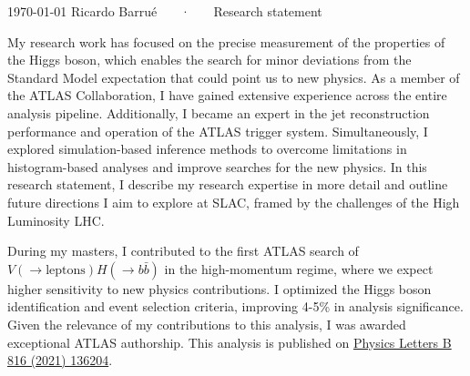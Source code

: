 \documentclass[11pt, a4paper]{awesome-cv}
\begin{document}
\makecvheader[R]

\makecvfooter
  {\today}
  {Ricardo Barrué ~~~·~~~ Research statement}
  {}

\makelettertitle

\begin{cvletter}

  My research work has focused on the precise measurement of the properties of the Higgs boson, which enables the search for minor deviations from the Standard Model expectation that could point us to new physics. As a member of the ATLAS Collaboration, I have gained extensive experience across the entire analysis pipeline. Additionally, I became an expert in the jet reconstruction performance and operation of the ATLAS trigger system. Simultaneously, I explored simulation-based inference methods to overcome limitations in histogram-based analyses and improve searches for the new physics. In this research statement, I describe my research expertise in more detail and outline future directions I aim to explore at SLAC, framed by the challenges of the High Luminosity LHC.

  
  During my masters, I contributed to the first ATLAS search of $V(\to \textrm{leptons})H(\to b\bar{b})$ in the high-momentum regime, where we expect higher sensitivity to new physics contributions. I optimized the Higgs boson identification and event selection criteria, improving 4-5\% in analysis significance. Given the relevance of my contributions to this analysis, I was awarded exceptional ATLAS authorship. This analysis is published on \href{https://doi.org/10.1016/j.physletb.2021.136204}{Physics Letters B 816 (2021) 136204}.
  

\end{cvletter}
\end{document}
